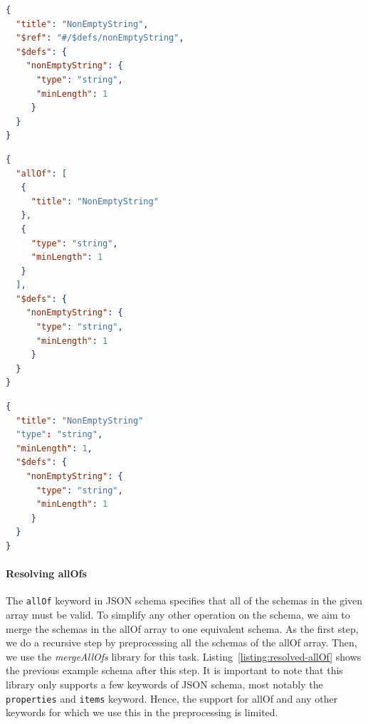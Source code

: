 \begin{lstlisting}[language=json,firstnumber=1,caption=
    {Simple JSON schema before reference resolving},captionpos=b]
{
  "title": "NonEmptyString",
  "$ref": "#/$defs/nonEmptyString",
  "$defs": {
    "nonEmptyString": {
      "type": "string",
      "minLength": 1
     }
  }
}
\end{lstlisting}\label{listing:preprocessing-example}

\begin{lstlisting}[language=json,firstnumber=1,caption=
    {Simple JSON schema after reference resolving},captionpos=b]
{
  "allOf": [
   {
     "title": "NonEmptyString"
   },
   {
     "type": "string",
     "minLength": 1
   }
  ],
  "$defs": {
    "nonEmptyString": {
      "type": "string",
      "minLength": 1
     }
  }
}
\end{lstlisting}\label{listing:reference-resolving}

\begin{lstlisting}[language=json, firstnumber=1, caption=
    {Simple JSON schema after allOf resolving}, captionpos=b]
{
  "title": "NonEmptyString"
  "type": "string",
  "minLength": 1,
  "$defs": {
    "nonEmptyString": {
      "type": "string",
      "minLength": 1
     }
  }
}
\end{lstlisting}\label{listing:resolved-allOf}

\paragraph{Resolving allOfs}

The \texttt{allOf} keyword in JSON schema specifies that all of the schemas in the given array must be valid.
To simplify any other operation on the schema, we aim to merge the schemas in the allOf array to one equivalent schema.
As the first step, we do a recursive step by preprocessing all the schemas of the allOf array.
Then, we use the \textit{mergeAllOfs} library %
for this task.
Listing~\ref{listing:resolved-allOf} shows the previous example schema after this step.
It is important to note that this library only supports a few keywords of JSON schema, most notably the
\texttt{properties} and \texttt{items} keyword.
Hence, the support for allOf and any other keywords for which we use this in the preprocessing is limited.

